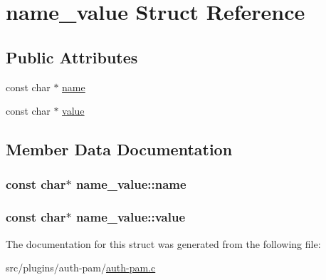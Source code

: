 \hypertarget{structname__value}{}\section{name\+\_\+value Struct Reference}
\label{structname__value}
\subsection*{Public Attributes}
\begin{DoxyCompactItemize}
\item 
const char $\ast$ \hyperlink{structname__value_a0c41a0e415a82b196b6eb0257d85351e}{name}
\item 
const char $\ast$ \hyperlink{structname__value_a1cbcb24f53b3e57c252f94c6893dcdbd}{value}
\end{DoxyCompactItemize}


\subsection{Member Data Documentation}
\hypertarget{structname__value_a0c41a0e415a82b196b6eb0257d85351e}{}
\subsubsection[{name}]{\setlength{\rightskip}{0pt plus 5cm}const char$\ast$ name\+\_\+value\+::name}\label{structname__value_a0c41a0e415a82b196b6eb0257d85351e}
\hypertarget{structname__value_a1cbcb24f53b3e57c252f94c6893dcdbd}{}
\subsubsection[{value}]{\setlength{\rightskip}{0pt plus 5cm}const char$\ast$ name\+\_\+value\+::value}\label{structname__value_a1cbcb24f53b3e57c252f94c6893dcdbd}


The documentation for this struct was generated from the following file\+:\begin{DoxyCompactItemize}
\item 
src/plugins/auth-\/pam/\hyperlink{auth-pam_8c}{auth-\/pam.\+c}\end{DoxyCompactItemize}
